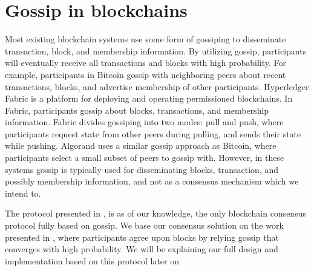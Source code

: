 \documentclass[USenglish]{uit-thesis}
\begin{document}
\begin{code}
\end{code}


\fi



\section{Gossip in blockchains}

Most existing blockchain systems use some form of gossiping to disseminate transaction, block, and membership information.
By utilizing gossip, participants will eventually receive all transactions and blocks with high probability. 
For example, participants in Bitcoin gossip with neighboring peers about recent transactions, blocks, and advertise membership of other participants.
Hyperledger Fabric \cite{hyper} is a platform for deploying and operating permissioned blockchains. 
In Fabric, participants gossip about blocks, transactions, and membership information.
Fabric divides gossiping into two modes: pull and push, where participants request state from other peers during pulling, and sends their state while pushing.
Algorand \cite{algorand} uses a similar gossip approach as Bitcoin, where participants select a small subset of peers to gossip with. 
However, in these systems gossip is typically used for disseminating blocks, transaction, and possibly membership information, and not as a consensus mechanism which we intend to. 

The protocol presented in \cite{vanblock}, is as of our knowledge, the only blockchain consensus protocol fully based on gossip.
We base our consensus solution on the work presented in \cite{vanblock}, where participants agree upon blocks by relying gossip that converges with high probability.
We will be explaining our full design and implementation based on this protocol later on
\end{document}
